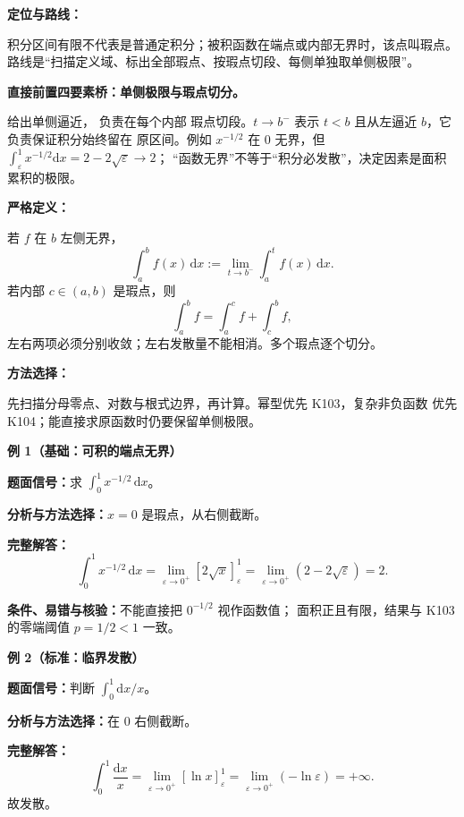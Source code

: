 
\par

\begin{knowledgeBox}
\textbf{定位与路线：}

积分区间有限不代表是普通定积分；被积函数在端点或内部无界时，该点叫瑕点。
路线是“扫描定义域、标出全部瑕点、按瑕点切段、每侧单独取单侧极限”。

\textbf{直接前置四要素桥：单侧极限与瑕点切分。}

给出单侧逼近，
负责在每个内部
瑕点切段。\(t\to b^-\) 表示 \(t<b\) 且从左逼近 \(b\)，它负责保证积分始终留在
原区间。例如 \(x^{-1/2}\) 在 \(0\) 无界，但
\(\int_\varepsilon^1x^{-1/2}\mathrm dx=2-2\sqrt\varepsilon\to2\)；
“函数无界”不等于“积分必发散”，决定因素是面积累积的极限。

\textbf{严格定义：}

若 \(f\) 在 \(b\) 左侧无界，
\[
\boxed{\int_a^bf(x)\,\mathrm dx
:=\lim_{t\to b^-}\int_a^tf(x)\,\mathrm dx.}
\]
若内部 \(c\in(a,b)\) 是瑕点，则
\[
\int_a^bf=\int_a^cf+\int_c^bf,
\]
左右两项必须分别收敛；左右发散量不能相消。多个瑕点逐个切分。

\textbf{方法选择：}

先扫描分母零点、对数与根式边界，再计算。幂型优先 K103，复杂非负函数
优先 K104；能直接求原函数时仍要保留单侧极限。

\textbf{例 1（基础：可积的端点无界）}

\textbf{题面信号：}求 \(\int_0^1x^{-1/2}\,\mathrm dx\)。

\textbf{分析与方法选择：}\(x=0\) 是瑕点，从右侧截断。

\textbf{完整解答：}
\[
\int_0^1x^{-1/2}\,\mathrm dx
=\lim_{\varepsilon\to0^+}[2\sqrt x]_\varepsilon^1
=\lim_{\varepsilon\to0^+}(2-2\sqrt\varepsilon)=2.
\]

\textbf{条件、易错与核验：}不能直接把 \(0^{-1/2}\) 视作函数值；
面积正且有限，结果与 K103 的零端阈值 \(p=1/2<1\) 一致。

\textbf{例 2（标准：临界发散）}

\textbf{题面信号：}判断 \(\int_0^1\mathrm dx/x\)。

\textbf{分析与方法选择：}在 \(0\) 右侧截断。

\textbf{完整解答：}
\[
\int_0^1\frac{\mathrm dx}{x}
=\lim_{\varepsilon\to0^+}[\ln x]_\varepsilon^1
=\lim_{\varepsilon\to0^+}(-\ln\varepsilon)=+\infty.
\]
故发散。


\end{knowledgeBox}
